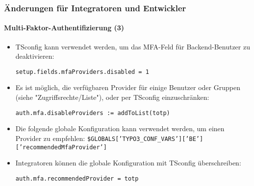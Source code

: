 %

\begin{frame}[fragile]
	\frametitle{Änderungen für Integratoren und Entwickler}
	\framesubtitle{Multi-Faktor-Authentifizierung (3)}


	\begin{itemize}
		\item TSconfig kann verwendet werden, um das MFA-Feld für Backend-Benutzer zu deaktivieren:
\begin{lstlisting}
setup.fields.mfaProviders.disabled = 1
\end{lstlisting}

		\item Es ist möglich, die verfügbaren Provider für einige Benutzer oder Gruppen
			(siehe "Zugriffsrechte/Liste"), oder per TSconfig einzuschränken:
\begin{lstlisting}
auth.mfa.disableProviders := addToList(totp)
\end{lstlisting}

		\item Die folgende globale Konfiguration kann verwendet werden, um einen Provider zu empfehlen:\newline
			\smaller\texttt{\$GLOBALS['TYPO3\_CONF\_VARS']['BE']['recommendedMfaProvider']}\normalsize

		\item Integratoren können die globale Konfiguration mit TSconfig überschreiben:
\begin{lstlisting}
auth.mfa.recommendedProvider = totp
\end{lstlisting}

	\end{itemize}

\end{frame}

